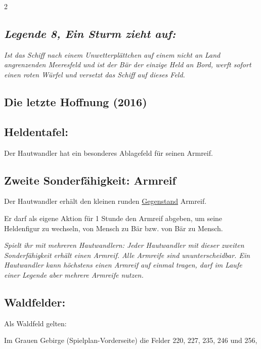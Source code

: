 \documentclass[10pt, a4paper, oneside]{book}
\newcommand{\fan}[1]{\textit{#1}}
\begin{document}
\begin{multicols*}{2}
\begin{bgcolor}
\subsection{\fan{Legende 8, Ein Sturm zieht auf:}}

\fan{Ist das Schiff nach einem Unwetterplättchen auf einem nicht an Land angrenzenden Meeresfeld und ist der Bär der einzige Held an Bord, werft sofort einen roten Würfel und versetzt das Schiff auf dieses Feld.}

\end{bgcolor}




\begin{bgcolor}
\section{Die letzte Hoffnung (2016)}


\subsection{Heldentafel:}

Der Hautwandler hat ein besonderes Ablagefeld für seinen Armreif.




\subsection{Zweite Sonderfähigkeit: Armreif}

Der Hautwandler erhält den kleinen runden \hyperref[Gegenstände und Sonderplättchen]{Gegenstand} Armreif.

Er darf als eigene Aktion für 1 Stunde den Armreif abgeben, um seine Heldenfigur zu wechseln, von Mensch zu Bär bzw. von Bär zu Mensch.
\supercite{DH11:Heldenkarte_Hautwandler}

\fan{Spielt ihr mit mehreren Hautwandlern: Jeder Hautwandler mit dieser zweiten Sonderfähigkeit erhält einen Armreif. Alle Armreife sind ununterscheidbar. Ein Hautwandler kann höchstens einen Armreif auf einmal tragen, darf im Laufe einer Legende aber mehrere Armreife nutzen.}



\subsection{Waldfelder:}

Als Waldfeld gelten:

\bullet{} Im Grauen Gebirge (Spielplan-Vorderseite) die Felder 220, 227, 235, 246 und 256,


\end{bgcolor}
\end{multicols*}
\end{document}
